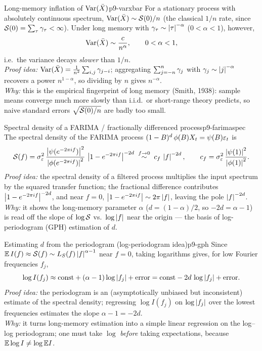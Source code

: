 \begin{proposition}{Long-memory inflation of $\operatorname{Var}(\bar X)$}{p9-varxbar}
For a stationary process with absolutely continuous spectrum,
$\operatorname{Var}(\bar X)\sim \mathcal{S}(0)/n$ (the classical $1/n$ rate, since
$\mathcal{S}(0)=\sum_\tau\gamma_\tau<\infty$). Under long memory with
$\gamma_\tau\sim\left\lvert \tau \right\rvert^{-\alpha}$ ($0<\alpha<1$), however,
\[
\operatorname{Var}(\bar X) \sim \frac{c}{n^{\alpha}},\qquad 0<\alpha<1 ,
\]
i.e.\ the variance decays \emph{slower} than $1/n$.\\
\textit{Proof idea:} $\operatorname{Var}(\bar X)=\frac1{n^2}\sum_{i,j}\gamma_{j-i}$; aggregating
$\sum_{j=-n}^{n}\gamma_j$ with $\gamma_j\sim\left\lvert j \right\rvert^{-\alpha}$ recovers a power
$n^{1-\alpha}$, so dividing by $n$ gives $n^{-\alpha}$.\\
\textit{Why:} this is the empirical fingerprint of long memory (Smith, 1938):
sample means converge much more slowly than i.i.d.\ or short-range theory
predicts, so naive standard errors $\sqrt{\mathcal{S}(0)/n}$ are badly too small.
\end{proposition}

\begin{theorem}{Spectral density of a FARIMA / fractionally differenced process}{p9-farimaspec}
The spectral density of the FARIMA process
$(1-B)^d\,\phi(B)X_t=\psi(B)\varepsilon_t$ is
\[
\mathcal{S}(f) = \sigma_\varepsilon^2\,
\frac{\left\lvert \psi(e^{-2\pi i f}) \right\rvert^2}{\left\lvert \phi(e^{-2\pi i f}) \right\rvert^2}\,
\left\lvert 1-e^{-2\pi i f} \right\rvert^{-2d}
\;\overset{f\to0}{\sim}\; c_f\,\left\lvert f \right\rvert^{-2d},
\qquad
c_f = \sigma_\varepsilon^2\,\frac{\left\lvert \psi(1) \right\rvert^2}{\left\lvert \phi(1) \right\rvert^2}.
\]
\textit{Proof idea:} the spectral density of a filtered process multiplies the
input spectrum by the squared transfer function; the fractional difference
contributes $\left\lvert 1-e^{-2\pi i f} \right\rvert^{-2d}$, and near $f=0$,
$\left\lvert 1-e^{-2\pi i f} \right\rvert\sim 2\pi\left\lvert f \right\rvert$, leaving the pole $\left\lvert f \right\rvert^{-2d}$.\\
\textit{Why:} it shows the long-memory parameter $\alpha$ ($d=(1-\alpha)/2$, so
$-2d=\alpha-1$) is read off the slope of $\log\mathcal{S}$ vs.\ $\log\left\lvert f \right\rvert$ near the
origin --- the basis of log-periodogram (GPH) estimation of $d$.
\end{theorem}

\begin{proposition}{Estimating $d$ from the periodogram (log-periodogram idea)}{p9-gph}
Since $\mathbb{E}\,I(f)\approx \mathcal{S}(f)\sim L_S(f)\left\lvert f \right\rvert^{\alpha-1}$ near $f=0$, taking
logarithms gives, for low Fourier frequencies $f_j$,
\[
\log I(f_j) \approx \mathrm{const} + (\alpha-1)\log\left\lvert f_j \right\rvert + \text{error}
= \mathrm{const} - 2d\,\log\left\lvert f_j \right\rvert + \text{error}.
\]
\textit{Proof idea:} the periodogram is an (asymptotically unbiased but
inconsistent) estimate of the spectral density; regressing $\log I(f_j)$ on
$\log\left\lvert f_j \right\rvert$ over the lowest frequencies estimates the slope $\alpha-1=-2d$.\\
\textit{Why:} it turns long-memory estimation into a simple linear regression on
the log--log periodogram; one must take $\log$ \emph{before} taking expectations,
because $\mathbb{E}\log I\ne\log\mathbb{E} I$.
\end{proposition}

